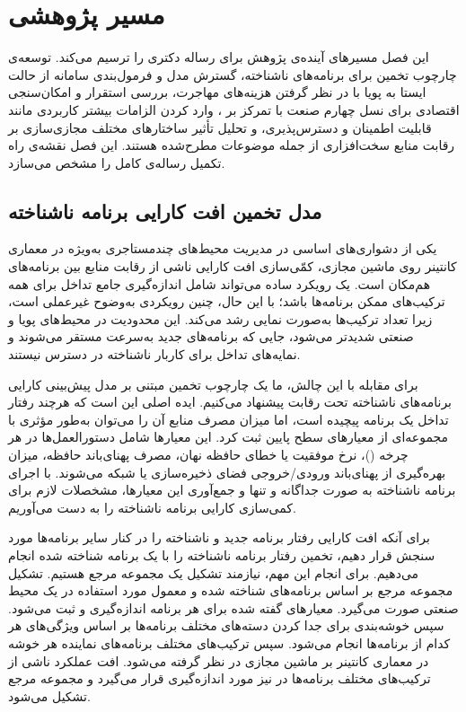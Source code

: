 
\chapter{مسیر پژوهشی}\label{chap:future}

این فصل مسیرهای آینده‌ی پژوهش برای رساله دکتری را ترسیم می‌کند. توسعه‌ی چارچوب تخمین برای برنامه‌های ناشناخته، گسترش مدل و فرمول‌بندی سامانه از حالت ایستا به پویا با در نظر گرفتن هزینه‌های مهاجرت، بررسی استقرار و امکان‌سنجی اقتصادی  برای نسل چهارم صنعت با تمرکز بر ، وارد کردن الزامات بیشتر کاربردی مانند قابلیت اطمینان و دسترس‌پذیری، و تحلیل تأثیر ساختارهای مختلف مجازی‌سازی بر رقابت منابع سخت‌افزاری از جمله موضوعات مطرح‌شده هستند. این فصل نقشه‌ی راه تکمیل رساله‌ی کامل را مشخص می‌سازد.

\section{مدل تخمین افت کارایی برنامه ناشناخته}

یکی از دشواری‌های اساسی در مدیریت محیط‌های چندمستاجری  به‌ویژه در معماری کانتینر روی ماشین مجازی، کمّی‌سازی افت کارایی ناشی از رقابت منابع بین برنامه‌های هم‌مکان است. یک رویکرد ساده می‌تواند شامل اندازه‌گیری جامع تداخل برای همه ترکیب‌های ممکن برنامه‌ها باشد؛ با این حال، چنین رویکردی به‌وضوح غیرعملی است، زیرا تعداد ترکیب‌ها به‌صورت نمایی رشد می‌کند. این محدودیت در محیط‌های پویا و صنعتی شدیدتر می‌شود، جایی که برنامه‌های جدید به‌سرعت مستقر می‌شوند و نمایه‌های تداخل برای کاربار ناشناخته در دسترس نیستند.

برای مقابله با این چالش، ما یک چارچوب تخمین مبتنی بر مدل پیش‌بینی کارایی برنامه‌های ناشناخته تحت رقابت پیشنهاد می‌کنیم. ایده اصلی این است که هرچند رفتار تداخل یک برنامه پیچیده است، اما میزان مصرف منابع آن را می‌توان به‌طور مؤثری با مجموعه‌ای از معیار‌های سطح پایین ثبت کرد. این معیار‌ها شامل دستورالعمل‌ها در هر چرخه ()، نرخ موفقیت یا خطای حافظه نهان، مصرف پهنای‌باند حافظه، میزان بهره‌گیری از پهنای‌باند ورودی/خروجی فضای ذخیره‌سازی یا شبکه می‌شوند. با اجرای برنامه ناشناخته به صورت جداگانه و تنها و جمع‌آوری این معیار‌ها، مشخصلات لازم برای کمی‌سازی کارایی برنامه ناشناخته را به دست می‌آوریم\cite{Masouros2021Rusty}.

برای آنکه افت کارایی رفتار برنامه جدید و ناشناخته را در کنار سایر برنامه‌ها مورد سنجش قرار دهیم، تخمین رفتار برنامه ناشناخته را با یک برنامه شناخته شده انجام می‌دهیم. برای انجام این مهم، نیازمند تشکیل یک مجموعه مرجع هستیم. تشکیل مجموعه مرجع بر اساس برنامه‌های شناخته شده و معمول مورد استفاده در یک محیط صنعتی صورت می‌گیرد. معیارهای گفته شده برای هر برنامه اندازه‌گیری و ثبت می‌شود. سپس خوشه‌بندی برای جدا کردن دسته‌های مختلف برنامه‌ها بر اساس ویژگی‌های هر کدام از برنامه‌ها انجام می‌شود\cite{Masouros2021Rusty}. سپس ترکیب‌های مختلف برنامه‌های نماینده هر خوشه در معماری کانتینر بر ماشین مجازی در نظر گرفته می‌شود. افت عملکرد ناشی از ترکیب‌های مختلف برنامه‌ها در  نیز مورد اندازه‌گیری قرار می‌گیرد و مجموعه مرجع تشکیل می‌شود.

